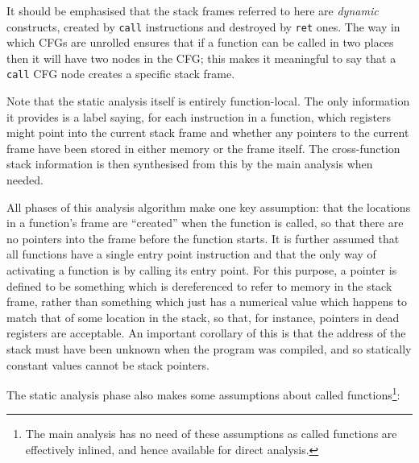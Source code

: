 It should be emphasised that the stack frames referred to here are
\emph{dynamic} constructs, created by \verb|call| instructions and
destroyed by \verb|ret| ones.  The way in which CFGs are unrolled
ensures that if a function can be called in two places then it will
have two nodes in the CFG; this makes it meaningful to say that a
\verb|call| CFG node creates a specific stack frame.

Note that the static analysis itself is entirely function-local.  The
only information it provides is a label saying, for each instruction
in a function, which registers might point into the current stack
frame and whether any pointers to the current frame have been stored
in either memory or the frame itself.  The cross-function stack
information is then synthesised from this by the main analysis when
needed.

All phases of this analysis algorithm make one key assumption: that
the locations in a function's frame are ``created'' when the function
is called, so that there are no pointers into the frame before the
function starts.  It is further assumed that all functions have a
single entry point instruction and that the only way of activating a
function is by calling its entry point.  For this purpose, a pointer
is defined to be something which is dereferenced to refer to memory in
the stack frame, rather than something which just has a numerical
value which happens to match that of some location in the stack, so
that, for instance, pointers in dead registers are acceptable.  An
important corollary of this is that the address of the stack must have
been unknown when the program was compiled, and so statically constant
values cannot be stack pointers.

The static analysis phase also makes some assumptions about called
functions\footnote{The main analysis has no need of these assumptions
  as called functions are effectively inlined, and hence available for
  direct analysis.}:

